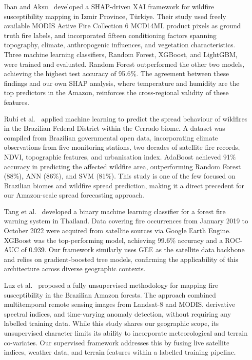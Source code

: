 \documentclass[12pt,a4paper]{article}
\begin{document}
Iban and Aksu~\cite{iban2024} developed a SHAP-driven XAI framework for wildfire susceptibility mapping in Izmir Province, T\"{u}rkiye. Their study used freely available MODIS Active Fire Collection 6 MCD14ML product pixels as ground truth fire labels, and incorporated fifteen conditioning factors spanning topography, climate, anthropogenic influences, and vegetation characteristics. Three machine learning classifiers, Random Forest, XGBoost, and LightGBM, were trained and evaluated. Random Forest outperformed the other two models, achieving the highest test accuracy of 95.6\%. The agreement between these findings and our own SHAP analysis, where temperature and humidity are the top predictors in the Amazon, reinforces the cross-regional validity of these features.

Rub\'{i} et al.~\cite{rubi2023} applied machine learning to predict the spread behaviour of wildfires in the Brazilian Federal District within the Cerrado biome. A dataset was compiled from Brazilian governmental open data, incorporating climate observations from five monitoring stations, two decades of satellite fire records, NDVI, topographic features, and urbanisation index. AdaBoost achieved 91\% accuracy in predicting the affected wildfire area, outperforming Random Forest (88\%), ANN (86\%), and SVM (81\%). This study is one of the few focused on Brazilian biomes and wildfire spread prediction, making it a direct precedent for our Amazon-scale spread forecasting approach.

Tang et al.~\cite{tang2024} developed a binary machine learning classifier for a forest fire warning system in Thailand. Data covering fire occurrences from January 2019 to October 2022 were acquired from satellite sources via Google Earth Engine. XGBoost was the top-performing model, achieving 99.6\% accuracy and a ROC-AUC of 0.939. Our framework similarly uses GEE as the satellite data backbone and relies on gradient-boosted tree models, confirming the applicability of this architecture across diverse geographic contexts.

Luz et al.~\cite{luz2022} proposed a fully unsupervised methodology for mapping fire susceptibility in the Brazilian Amazon forests. The approach combined multitemporal remote sensing images from Landsat-8 and MODIS, derivative spectral indices, and time-varying anomaly detection, without requiring any labelled training data. While this study shares our geographic scope, its unsupervised character limits its ability to incorporate meteorological and terrain co-variates. Our supervised framework addresses this by fusing live satellite indices, weather data, and terrain features within a labelled training pipeline.
\end{document}

